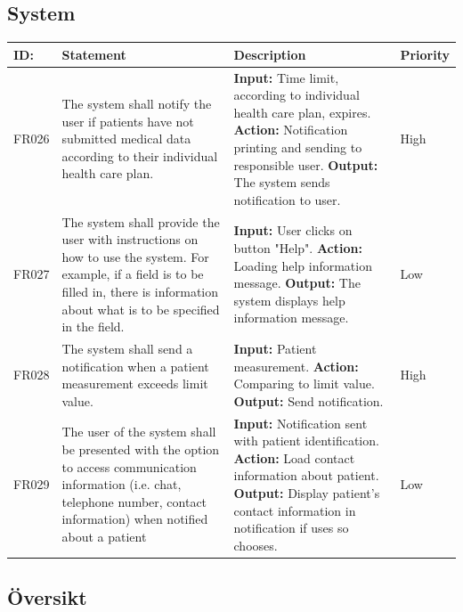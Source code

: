 \documentclass{scrreprt}
\begin{document}
\subsection{System}
\begin{center}
\begin{tabularx}{\linewidth}{| l | X | X | l |}
\hline
\textbf{ID:} & \textbf{Statement} & \textbf{Description} & \textbf{Priority} \\ 
\hline
FR026 & The system shall notify the user if patients have not submitted medical data according to their individual health care plan. & \textbf{Input:} Time limit, according to individual health care plan, expires.
\newline \textbf{Action:} Notification printing and sending to responsible user.
\newline \textbf{Output:} The system sends notification to user. & High \\ 
\hline
FR027 & The system shall provide the user with instructions on how to use the system. For example, if a field is to be filled in, there is information about what is to be specified in the field. & \textbf{Input:} User clicks on button "Help".
\newline \textbf{Action:} Loading help information message.
\newline \textbf{Output:} The system displays help information message. & Low \\ 
\hline
FR028 & The system shall send a notification when a patient measurement exceeds limit value. & \textbf{Input:} Patient measurement.
\newline \textbf{Action:} Comparing to limit value.
\newline \textbf{Output:} Send notification. & High \\
\hline
FR029 & The user of the system shall be presented with the option to access communication information (i.e. chat, telephone number, contact information) when notified about a patient & \textbf{Input:} Notification sent with patient identification.
\newline \textbf{Action:} Load contact information about patient.
\newline \textbf{Output:} Display patient's contact information in notification if uses so chooses. & Low \\
\hline
\end{tabularx}
\end{center}

\subsection{Översikt}
\end{document}
